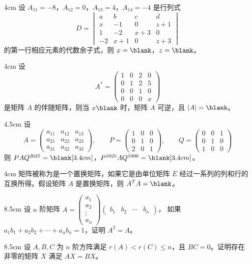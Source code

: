 \begin{problem}{}{4cm}
设 $A_{11}=-8$，$A_{12}=0$，$A_{13}=4$，$A_{14}=-4$ 是行列式
\[
D=\begin{vmatrix}a&b&c&d\\x&-1&0&z+1\\1&-2&x+3&0\\-2&x+1&0&z+3\end{vmatrix}
\]
的第一行相应元素的代数余子式，则 $x=\blank$，$z=\blank$。
\end{problem}

\begin{problem}{}{4cm}
设
\[
A^{*}=\begin{pmatrix}1&0&2&0\\0&1&2&5\\0&0&1&0\\0&0&0&x\end{pmatrix}
\]
是矩阵 $A$ 的伴随矩阵，则当 $x\blank$ 时，矩阵 $A$ 可逆，且 $|A|=\blank$。
\end{problem}

\begin{problem}{}{4.5cm}
设
\[
A=\begin{pmatrix}a_{11}&a_{12}&a_{13}\\a_{21}&a_{22}&a_{23}\\a_{31}&a_{32}&a_{33}\end{pmatrix},\qquad
P=\begin{pmatrix}1&0&0\\0&1&0\\2&0&1\end{pmatrix},\qquad
Q=\begin{pmatrix}0&0&1\\0&1&0\\1&0&0\end{pmatrix}
\]
则 $PAQ^{2025}=\blank[3.4cm]$，$P^{1025}AQ^{1000}=\blank[3.4cm]$。
\end{problem}

\begin{problem}{}{4cm}
矩阵被称为是一个置换矩阵，如果它是由单位矩阵 $E$ 经过一系列的列和行的互换所得。假设矩阵 $A$ 是置换矩阵，则 $A^{T}A=\blank$。
\end{problem}


\begin{problem}{}{8.5cm}
设 $n$ 阶矩阵
$A=\begin{pmatrix}a_1\\a_2\\\vdots\\a_n\end{pmatrix}\begin{pmatrix}b_1&b_2&\cdots&b_n\end{pmatrix}$，
如果 $a_1b_1+a_2b_2+\cdots+a_nb_n=1$，证明 $A^{2}=A$。
\end{problem}

\begin{problem}{}{8.5cm}
设 $A,B,C$ 为 $n$ 阶方阵满足 $r(A)<r(C)\le n$，且 $BC=0$。证明存在非零的矩阵 $X$ 满足 $AX=BX$。
\end{problem}

